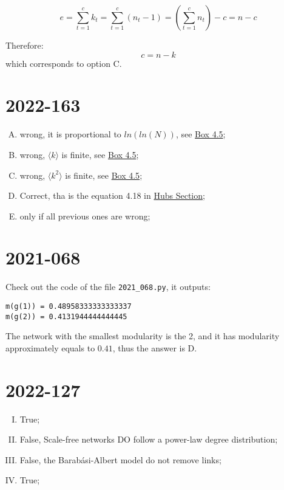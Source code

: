 \documentclass{article}
\begin{document}
$$
e
=
\displaystyle\sum\limits_{t=1}^{c} k_t
=
\displaystyle\sum\limits_{t=1}^{c} \left( n_t - 1 \right)
=
\left( \displaystyle\sum\limits_{t=1}^{c} n_t \right) - c
=
n - c
$$

Therefore:
$$ c = n - k $$
which corresponds to option C.

\section{2022-163}\label{2022-163}

\begin{enumerate}[A.]
    \item wrong, it is proportional to $ln(ln(N))$, see \href{http://networksciencebook.com/chapter/4#degree-exponent}{Box 4.5};
    \item wrong, $\langle k \rangle$ is finite, see \href{http://networksciencebook.com/chapter/4#degree-exponent}{Box 4.5};
    \item wrong, $\langle k^2 \rangle$ is finite, see \href{http://networksciencebook.com/chapter/4#degree-exponent}{Box 4.5};
    \item Correct, tha is the equation 4.18 in \href{http://networksciencebook.com/chapter/4#hubs}{Hubs Section};
    \item only if all previous ones are wrong;
\end{enumerate}

\section{2021-068}\label{2021-068}

Check out the code of the file \verb|2021_068.py|, it outputs:

\begin{verbatim}
m(g(1)) = 0.48958333333333337
m(g(2)) = 0.4131944444444445
\end{verbatim}

The network with the smallest modularity is the 2, and it has modularity approximately equals to $0.41$, thus the answer is D.

\section{2022-127}\label{2022-127}

\begin{enumerate}[I.]
    \item True;
    \item False, Scale-free networks DO follow a power-law degree distribution;
    \item False, the Barabási-Albert model do not remove links;
    \item True;
\end{enumerate}
\end{document}
